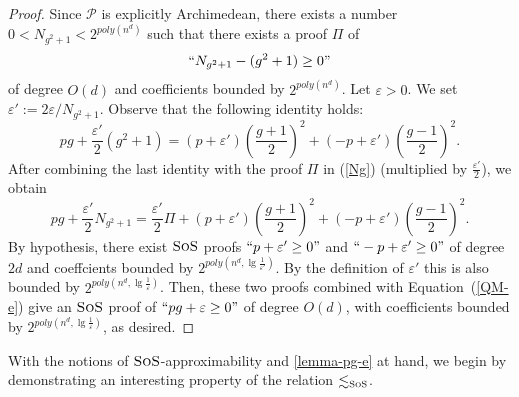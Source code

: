 \documentclass[11pt]{article}
\newcommand{\sos}{\text{\sc{SoS}}}
\newcommand{\1}{\textbf{1}}
\begin{document}
\begin{proof}
Since $\mathcal{P}$ is explicitly Archimedean, there exists a number $0 < N_{g^2+1} < 2^{poly(n^d)}$ such that there exists a proof $\Pi$ of
\begin{align}\label{Ng}
    ``N_{g^2+1} - (g^2+1) \geq 0"
\end{align}
of degree $O(d)$ and coefficients bounded by $2^{poly(n^d)}$. Let $\varepsilon>0$. We set $\varepsilon':= 2\varepsilon/N_{g^2+1}$.  Observe that the following identity holds:
    \begin{equation}\label{identity-fg}
        p g + \frac{\varepsilon'}{2}(g^2 + 1) = (p+\varepsilon')\left( \frac{g+1}{2} \right)^2 + (- p+\varepsilon' )\left( \frac{g-1}{2} \right)^2.
    \end{equation}
After combining the last identity with the proof $\Pi$ in (\ref{Ng}) (multiplied by $\frac{\varepsilon'}{2}$), we obtain  
    \begin{equation}\label{QM-e}
        pg + \frac{\varepsilon'}{2}N_{g^2+1} = \frac{\varepsilon'}{2}\Pi + (p+\varepsilon' )\left( \frac{g+1}{2} \right)^2 + (-p+\varepsilon')\left( \frac{g-1}{2} \right)^2.
    \end{equation}
 By hypothesis, there exist $\sos$ proofs  $``p + \varepsilon' \geq 0"$ and  
      $``-p + \varepsilon' \geq 0"$ of degree $2d$ and coeffcients bounded by $2^{poly(n^d,\lg\frac{1}{\varepsilon'})}$. By the definition of $\varepsilon'$ this is also bounded by $2^{poly(n^d,\lg\frac{1}{\varepsilon})}$. Then, these two proofs combined with Equation~(\ref{QM-e}) give an $\sos$ proof of $``pg+\varepsilon\geq 0"$ of degree $O(d)$, with coefficients bounded by $2^{poly(n^d, \lg\frac{1}{\varepsilon})}$, as desired.
\end{proof}

With the notions of $\sos$-approximability and \cref{lemma-pg-e} at hand, we begin by demonstrating an interesting property of the relation $\lesssim_{\sos}$.
\end{document}
